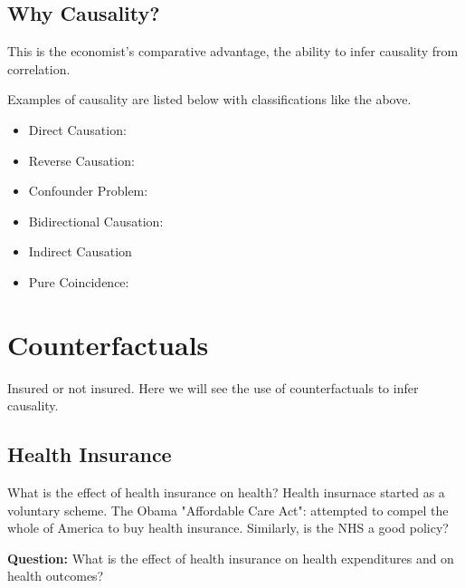 \documentclass[12pt, letterpaper]{article}
\begin{document}
{\subsection{Why Causality?}
This is the economist's comparative advantage, the ability to infer causality from correlation.

\vspace{10pt}
\noindent Examples of causality are listed below with classifications like the above.
\begin{itemize}
	\item Direct Causation:
	\item Reverse Causation:
	\item Confounder Problem:
	\item Bidirectional Causation:
	\item Indirect Causation
	\item Pure Coincidence:
\end{itemize}

\section{Counterfactuals}
Insured or not insured. Here we will see the use of counterfactuals to infer causality.

\subsection{Health Insurance}
What is the effect of health insurance on health? Health insurnace started as a voluntary scheme. The Obama "Affordable Care Act": attempted to compel the whole of America to buy health insurance. Similarly, is the NHS a good policy?


\textbf{Question:} What is the effect of health insurance on health expenditures and on health outcomes?

}
\end{document}
